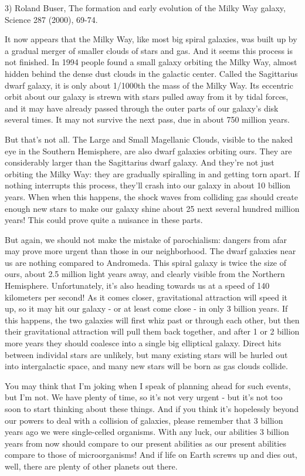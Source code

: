 3) Roland Buser, The formation and early evolution of the Milky Way
galaxy, Science 287 (2000), 69-74.

It now appears that the Milky Way, like most big spiral galaxies, was
built up by a gradual merger of smaller clouds of stars and gas.  And
it seems this process is not finished.  In 1994 people found  a small
galaxy orbiting the Milky Way, almost hidden behind the dense dust
clouds in the galactic center.  Called the Sagittarius dwarf galaxy, it
is only about 1/1000th the mass of the Milky Way.  Its eccentric orbit
about our galaxy is strewn with stars pulled away from it by tidal
forces, and it may have already passed through the outer parts of our
galaxy's disk several times.  It may not survive the next pass, due in
about 750 million years.  

But that's not all.  The Large and Small Magellanic Clouds, visible to
the naked eye in the Southern Hemisphere, are also dwarf galaxies
orbiting ours.   They are considerably larger than the Sagittarius dwarf
galaxy.  And they're not just orbiting the Milky Way: they are gradually
spiralling in and getting torn apart.  If nothing interrupts this
process, they'll crash into our galaxy in about 10 billion years.  When
when this happens, the shock waves from colliding gas should create
enough new stars to make our galaxy shine about 25%
next several hundred million years!  This could prove quite a nuisance
in these parts.

But again, we should not make the mistake of parochialism: dangers from
afar may prove more urgent than those in our neighborhood.   The dwarf
galaxies near us are nothing compared to Andromeda.   This spiral galaxy
is twice the size of ours, about 2.5 million light years away, and
clearly visible from the Northern Hemisphere.  Unfortunately, it's also
heading towards us at a speed of 140 kilometers per second!  As it comes
closer, gravitational attraction will speed it up, so it may hit our 
galaxy - or at least come close - in only 3 billion years.   If this 
happens, the two galaxies will first whiz past or through each
other, but then their gravitational attraction will pull them back
together, and after 1 or 2 billion more years they should coalesce into
a single big elliptical galaxy.  Direct hits between individal stars are
unlikely, but many existing stars will be hurled out into intergalactic
space, and many new stars will be born as gas clouds collide.  

You may think that I'm joking when I speak of planning ahead for such
events, but I'm not.  We have plenty of time, so it's not very urgent
- but it's not too soon to start thinking about these things.   And if
you think it's hopelessly beyond our powers to deal with a collision of
galaxies, please remember that 3 billion years ago we were single-celled
organisms.  With any luck, our abilities 3 billion years from now should
compare to our present abilities as our present abilities compare to
those of microorganisms!  And if life on Earth screws up and dies out,
well, there are plenty of other planets out there.

